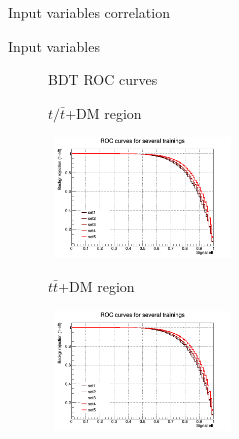 \documentclass[8pt]{beamer}
\begin{document}
\begin{frame}{Input variables correlation}
\begin{figure}[htbp]
\label{fig:correlationVar}
\end{figure}
\end{frame}

\begin{frame}{Input variables}
\justifying

\begin{figure}[htbp]
\centering
\begin{block}{ \centering BDT ROC curves}\end{block}
\begin{minipage}[b]{.48\textwidth}
\begin{center} \vspace{-8pt}
\begin{block}{\centering $t/\bar t$+DM region}\end{block}
\includegraphics[width=5cm, height=3.2cm]{figs/BDT_input_ST.png}
\end{center}
\end{minipage}\hfill
\begin{minipage}[b]{.48\textwidth}
\begin{center}  \vspace{-8pt}
\begin{block}{\centering $t \bar t$+DM region}\end{block}
\includegraphics[width=5cm, height=3.2cm]{figs/BDT_input_TTbar.png}
\end{center}
\end{minipage}\hfill


\end{figure}
\end{frame}
\end{document}

